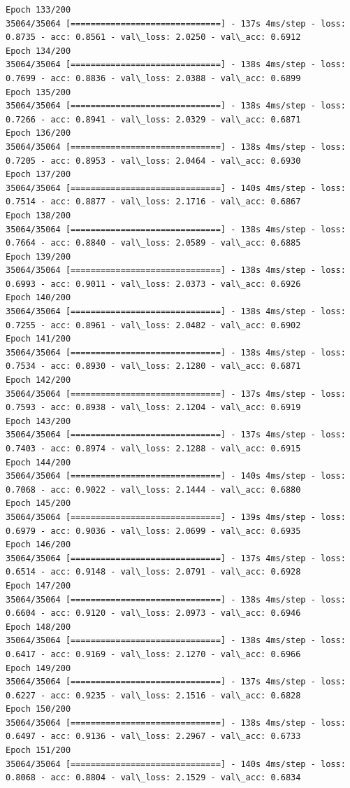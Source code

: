 \documentclass[11pt]{article}
\begin{document}
\begin{Verbatim}[commandchars=\\\{\}]
Epoch 133/200
35064/35064 [==============================] - 137s 4ms/step - loss: 0.8735 - acc: 0.8561 - val\_loss: 2.0250 - val\_acc: 0.6912
Epoch 134/200
35064/35064 [==============================] - 138s 4ms/step - loss: 0.7699 - acc: 0.8836 - val\_loss: 2.0388 - val\_acc: 0.6899
Epoch 135/200
35064/35064 [==============================] - 138s 4ms/step - loss: 0.7266 - acc: 0.8941 - val\_loss: 2.0329 - val\_acc: 0.6871
Epoch 136/200
35064/35064 [==============================] - 138s 4ms/step - loss: 0.7205 - acc: 0.8953 - val\_loss: 2.0464 - val\_acc: 0.6930
Epoch 137/200
35064/35064 [==============================] - 140s 4ms/step - loss: 0.7514 - acc: 0.8877 - val\_loss: 2.1716 - val\_acc: 0.6867
Epoch 138/200
35064/35064 [==============================] - 138s 4ms/step - loss: 0.7664 - acc: 0.8840 - val\_loss: 2.0589 - val\_acc: 0.6885
Epoch 139/200
35064/35064 [==============================] - 138s 4ms/step - loss: 0.6993 - acc: 0.9011 - val\_loss: 2.0373 - val\_acc: 0.6926
Epoch 140/200
35064/35064 [==============================] - 138s 4ms/step - loss: 0.7255 - acc: 0.8961 - val\_loss: 2.0482 - val\_acc: 0.6902
Epoch 141/200
35064/35064 [==============================] - 138s 4ms/step - loss: 0.7534 - acc: 0.8930 - val\_loss: 2.1280 - val\_acc: 0.6871
Epoch 142/200
35064/35064 [==============================] - 137s 4ms/step - loss: 0.7593 - acc: 0.8938 - val\_loss: 2.1204 - val\_acc: 0.6919
Epoch 143/200
35064/35064 [==============================] - 137s 4ms/step - loss: 0.7403 - acc: 0.8974 - val\_loss: 2.1288 - val\_acc: 0.6915
Epoch 144/200
35064/35064 [==============================] - 140s 4ms/step - loss: 0.7068 - acc: 0.9022 - val\_loss: 2.1444 - val\_acc: 0.6880
Epoch 145/200
35064/35064 [==============================] - 139s 4ms/step - loss: 0.6979 - acc: 0.9036 - val\_loss: 2.0699 - val\_acc: 0.6935
Epoch 146/200
35064/35064 [==============================] - 137s 4ms/step - loss: 0.6514 - acc: 0.9148 - val\_loss: 2.0791 - val\_acc: 0.6928
Epoch 147/200
35064/35064 [==============================] - 138s 4ms/step - loss: 0.6604 - acc: 0.9120 - val\_loss: 2.0973 - val\_acc: 0.6946
Epoch 148/200
35064/35064 [==============================] - 138s 4ms/step - loss: 0.6417 - acc: 0.9169 - val\_loss: 2.1270 - val\_acc: 0.6966
Epoch 149/200
35064/35064 [==============================] - 137s 4ms/step - loss: 0.6227 - acc: 0.9235 - val\_loss: 2.1516 - val\_acc: 0.6828
Epoch 150/200
35064/35064 [==============================] - 138s 4ms/step - loss: 0.6497 - acc: 0.9136 - val\_loss: 2.2967 - val\_acc: 0.6733
Epoch 151/200
35064/35064 [==============================] - 140s 4ms/step - loss: 0.8068 - acc: 0.8804 - val\_loss: 2.1529 - val\_acc: 0.6834

\end{Verbatim}
\end{document}
